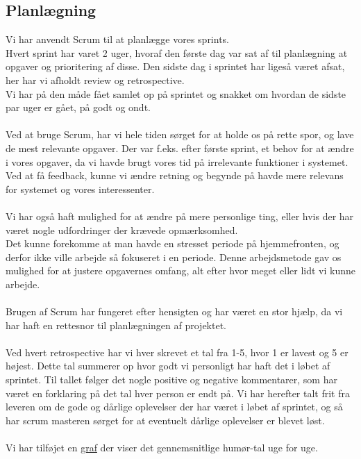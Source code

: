 \subsection{Planlægning}
Vi har anvendt Scrum til at planlægge vores sprints.
\\
Hvert sprint har varet 2 uger, hvoraf den første dag var sat af til planlægning at opgaver og prioritering af disse.
Den sidste dag i sprintet har ligeså været afsat, her har vi afholdt review og retrospective.
\\
Vi har på den måde fået samlet op på sprintet og snakket om hvordan de sidste par uger er gået, på godt og ondt.
\\\\
Ved at bruge Scrum, har vi hele tiden sørget for at holde os på rette spor, og lave de mest relevante opgaver.
Der var f.eks. efter første sprint, et behov for at ændre i vores opgaver, da vi havde brugt vores tid på irrelevante funktioner i systemet.
Ved at få feedback, kunne vi ændre retning og begynde på havde mere relevans for systemet og vores interessenter.
\\\\
Vi har også haft mulighed for at ændre på mere personlige ting, eller hvis der har været nogle udfordringer der krævede opmærksomhed.
\\
Det kunne forekomme at man havde en stresset periode på hjemmefronten, og derfor ikke ville arbejde så fokuseret i en periode.
Denne arbejdsmetode gav os mulighed for at justere opgavernes omfang, alt efter hvor meget eller lidt vi kunne arbejde.
\\\\
Brugen af Scrum har fungeret efter hensigten og har været en stor hjælp, da vi har haft en rettesnor til planlægningen af projektet.
\\\\
Ved hvert retrospective har vi hver skrevet et tal fra 1-5, hvor 1 er lavest og 5 er højest. Dette tal summerer op hvor godt vi personligt
har haft det i løbet af sprintet.
Til tallet følger det nogle positive og negative kommentarer, som har været en forklaring på det tal hver person er endt på.
Vi har herefter talt frit fra leveren om de gode og dårlige oplevelser der har været i løbet af sprintet, og så har scrum masteren sørget for at
eventuelt dårlige oplevelser er blevet løst.
\\\\
Vi har tilføjet en \hyperref[fig:happi]{graf} der viser det gennemsnitlige humør-tal uge for uge.
\\
